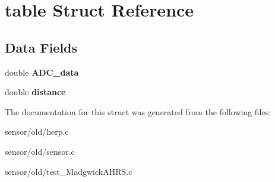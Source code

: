 \hypertarget{structtable}{}\section{table Struct Reference}
\label{structtable}
\subsection*{Data Fields}
\begin{DoxyCompactItemize}
\item 
double {\bfseries A\+D\+C\+\_\+data}\hypertarget{structtable_aa001cc67b1ec73e43eb6bd32d24a739b}{}\label{structtable_aa001cc67b1ec73e43eb6bd32d24a739b}

\item 
double {\bfseries distance}\hypertarget{structtable_a79b8e036dca6911e3295a47d99f21f43}{}\label{structtable_a79b8e036dca6911e3295a47d99f21f43}

\end{DoxyCompactItemize}


The documentation for this struct was generated from the following files\+:\begin{DoxyCompactItemize}
\item 
sensor/old/herp.\+c\item 
sensor/old/sensor.\+c\item 
sensor/old/test\+\_\+\+Madgwick\+A\+H\+R\+S.\+c\end{DoxyCompactItemize}

